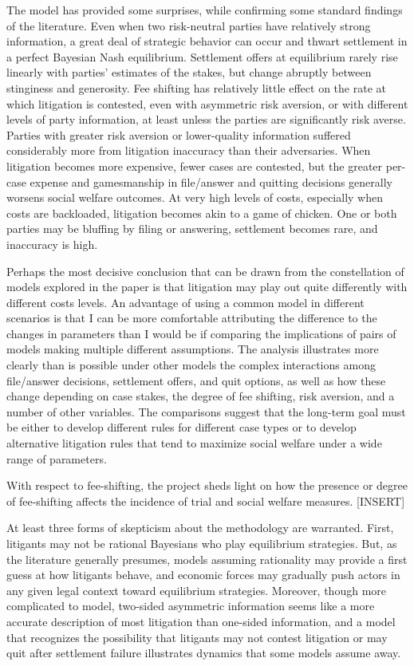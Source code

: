 \documentclass{article}
\begin{document}
The model has provided some surprises, while confirming some standard findings of the literature. Even when two risk-neutral parties have relatively strong information, a great deal of strategic behavior can occur and thwart settlement in a perfect Bayesian Nash equilibrium. Settlement offers at equilibrium rarely rise linearly with parties' estimates of the stakes, but change abruptly between stinginess and generosity. Fee shifting has relatively little effect on the rate at which litigation is contested, even with asymmetric risk aversion, or with different levels of party information, at least unless the parties are significantly risk averse. Parties with greater risk aversion or lower-quality information suffered considerably more from litigation inaccuracy than their adversaries.  When litigation becomes more expensive, fewer cases are contested, but the greater per-case expense and gamesmanship in file/answer and quitting decisions generally worsens social welfare outcomes. At very high levels of costs, especially when costs are backloaded, litigation becomes akin to a game of chicken. One or both parties may be bluffing by filing or answering, settlement becomes rare, and inaccuracy is high. 

Perhaps the most decisive conclusion that can be drawn from the constellation of models explored in the paper is that litigation may play out quite differently with different costs levels. An advantage of using a common model in different scenarios is that I can be more comfortable attributing the difference to the changes in parameters than I would be if comparing the implications of pairs of models making multiple different assumptions. The analysis illustrates more clearly than is possible under other models the complex interactions among file/answer decisions, settlement offers, and quit options, as well as how these change depending on case stakes, the degree of fee shifting, risk aversion, and a number of other variables. The comparisons suggest that the long-term goal must be either to develop different rules for different case types or to develop alternative litigation rules that tend to maximize social welfare under a wide range of parameters. 

With respect to fee-shifting, the project sheds light on how the presence or degree of fee-shifting affects the incidence of trial and social welfare measures. [INSERT]

At least three forms of skepticism about the methodology are warranted. First, litigants may not be rational Bayesians who play equilibrium strategies. But, as the literature generally presumes, models assuming rationality may provide a first guess at how litigants behave, and economic forces may gradually push actors in any given legal context toward equilibrium strategies.  Moreover, though more complicated to model, two-sided asymmetric information seems like a more accurate description of most litigation than one-sided information, and a model that recognizes the possibility that litigants may not contest litigation or may quit after settlement failure illustrates dynamics that some models assume away. 
\end{document}

